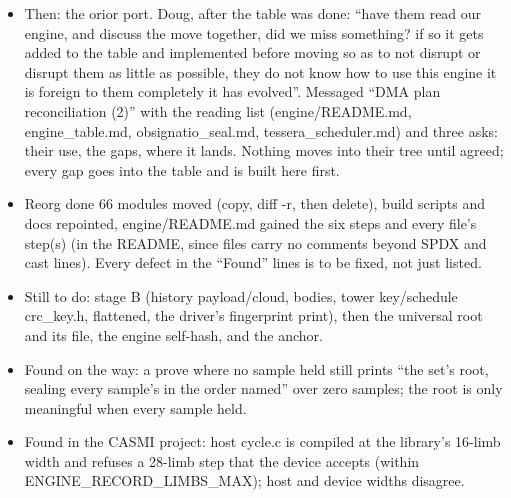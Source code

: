 \begin{itemize}
\item Then: the orior port. Doug, after the table was done: “have them read our engine, and discuss the move together, did we miss something? if so it gets added to the table and implemented before moving so as to not disrupt or disrupt them as little as possible, they do not know how to use this engine it is foreign to them completely it has evolved”. Messaged “DMA plan reconciliation (2)” with the reading list (engine/README.md, engine\_\allowbreak{}table.md, obsignatio\_\allowbreak{}seal.md, tessera\_\allowbreak{}scheduler.md) and three asks: their use, the gaps, where it lands. Nothing moves into their tree until agreed; every gap goes into the table and is built here first.
\item Reorg done 66 modules moved (copy, diff -r, then delete), build scripts and docs repointed, engine/README.md gained the six steps and every file's step(s) (in the README, since files carry no comments beyond SPDX and cast lines). Every defect in the “Found” lines is to be fixed, not just listed.
\item Still to do: stage B (history payload/cloud, bodies, tower key/schedule crc\_\allowbreak{}key.h, flattened, the driver's fingerprint print), then the universal root and its file, the engine self-hash, and the anchor.
\item Found on the way: a prove where no sample held still prints “the set's root, sealing every sample's in the order named” over zero samples; the root is only meaningful when every sample held.
\item Found in the CASMI project: host cycle.c is compiled at the library's 16-limb width and refuses a 28-limb step that the device accepts (within ENGINE\_\allowbreak{}RECORD\_\allowbreak{}LIMBS\_\allowbreak{}MAX); host and device widths disagree.
\end{itemize}

